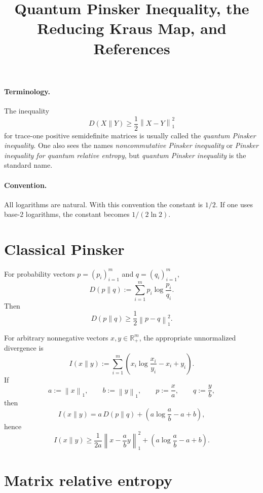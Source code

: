\documentclass[11pt]{article}
\theoremstyle{definition}
\newcommand{\1}{\mathbf{1}}
\newcommand{\norm}[1]{\left\lVert #1 \right\rVert}
\begin{document}
\title{Quantum Pinsker Inequality, the Reducing Kraus Map, and References}
\author{}
\date{}
\maketitle

\paragraph{Terminology.}
The inequality
\[
D(X\|Y)\ge \frac12 \norm{X-Y}_1^2
\]
for trace-one positive semidefinite matrices is usually called the \emph{quantum Pinsker inequality}. One also sees the names \emph{noncommutative Pinsker inequality} or \emph{Pinsker inequality for quantum relative entropy}, but \emph{quantum Pinsker inequality} is the standard name.

\paragraph{Convention.}
All logarithms are natural. With this convention the constant is $1/2$. If one uses base-$2$ logarithms, the constant becomes $1/(2\ln 2)$.

\section{Classical Pinsker}

For probability vectors $p=(p_i)_{i=1}^m$ and $q=(q_i)_{i=1}^m$,
\[
D(p\|q):=\sum_{i=1}^m p_i\log\frac{p_i}{q_i}.
\]
Then
\begin{equation}\label{eq:classical-pinsker}
D(p\|q)\ge \frac12 \norm{p-q}_1^2.
\end{equation}

For arbitrary nonnegative vectors $x,y\in \mathbb{R}_+^m$, the appropriate unnormalized divergence is
\[
I(x\|y):=\sum_{i=1}^m\left(x_i\log\frac{x_i}{y_i}-x_i+y_i\right).
\]
If
\[
a:=\norm{x}_1,\qquad b:=\norm{y}_1,
\qquad
p:=\frac{x}{a},\qquad q:=\frac{y}{b},
\]
then
\begin{equation}\label{eq:classical-splitting}
I(x\|y)=a\,D(p\|q)+\left(a\log\frac{a}{b}-a+b\right),
\end{equation}
hence
\begin{equation}\label{eq:classical-unnormalized-pinsker}
I(x\|y)\ge \frac{1}{2a}\norm{x-\frac{a}{b}y}_1^2+\left(a\log\frac{a}{b}-a+b\right).
\end{equation}

\section{Matrix relative entropy}
\end{document}
